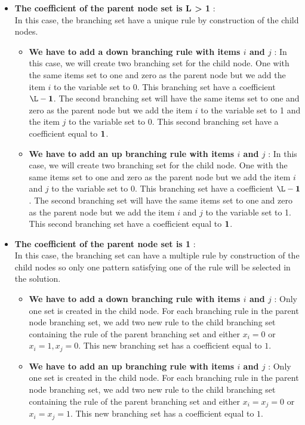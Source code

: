 \begin{itemize}
	\item \textbf{The coefficient of the parent node set is L > 1} : \\
	In this case, the branching set have a unique rule by construction of the child nodes.
	\begin{itemize}
		\item \textbf{We have to add a down branching rule with items $i$ and $j$} : In this case, we will create two branching set for the child node. One with the same items set to one and zero as the parent node but we add the item $i$ to the variable set to 0. This branching set have a coefficient $\L-\1$. The second branching set will have the same items set to one and zero as the parent node but we add the item $i$ to the variable set to 1 and the item $j$ to the variable set to 0. This second branching set have a coefficient equal to ${\mathbf 1}$.
	\end{itemize}
	\begin{itemize}
		\item \textbf{We have to add an up branching rule with items $i$ and $j$} : In this case, we will create two branching set for the child node. One with the same items set to one and zero as the parent node but we add the item $i$ and $j$ to the variable set to 0. This branching set have a coefficient $\L-\1$. The second branching set will have the same items set to one and zero as the parent node but we add the item $i$ and $j$ to the variable set to 1. This second branching set have a coefficient equal to ${\mathbf 1}$.
	\end{itemize}
	\item \textbf{The coefficient of the parent node set is 1} : \\
	In this case, the branching set can have a multiple rule by construction of the child nodes so only one pattern satisfying one of the rule will be selected in the solution.
	\begin{itemize}
		\item \textbf{We have to add a down branching rule with items $i$ and $j$} : Only one set is created in the child node. For each branching rule in the parent node branching set, we add two new rule to the child branching set containing the rule of the parent branching set and either $x_i = 0$ or $x_i=1, x_j=0$. This new branching set has a coefficient equal to $1$.
	\end{itemize}
	\begin{itemize}
		\item \textbf{We have to add an up branching rule with items $i$ and $j$} : Only one set is created in the child node. For each branching rule in the parent node branching set, we add two new rule to the child branching set containing the rule of the parent branching set and either $x_i = x_j = 0$ or $x_i=x_j=1$. This new branching set has a coefficient equal to $1$.
	\end{itemize}
\end{itemize}

